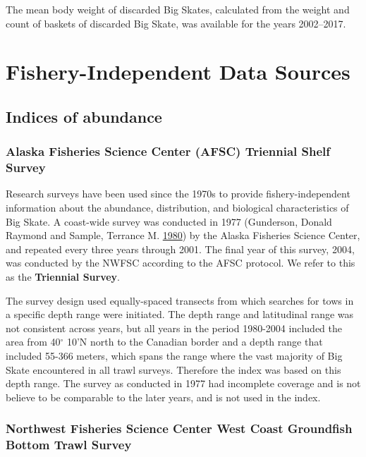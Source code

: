 \documentclass[12pt,]{article}
\begin{document}
The mean body weight of discarded Big Skates, calculated from the weight
and count of baskets of discarded Big Skate, was available for the years
2002--2017.

\hypertarget{fishery-independent-data-sources}{%
\section{Fishery-Independent Data
Sources}\label{fishery-independent-data-sources}}

\hypertarget{indices-of-abundance}{%
\subsection{Indices of abundance}\label{indices-of-abundance}}

\hypertarget{alaska-fisheries-science-center-afsc-triennial-shelf-survey}{%
\subsubsection{Alaska Fisheries Science Center (AFSC) Triennial Shelf
Survey}\label{alaska-fisheries-science-center-afsc-triennial-shelf-survey}}

Research surveys have been used since the 1970s to provide
fishery-independent information about the abundance, distribution, and
biological characteristics of Big Skate. A coast-wide survey was
conducted in 1977 (Gunderson, Donald Raymond and Sample, Terrance M.
\protect\hyperlink{ref-Gunderson1980}{1980}) by the Alaska Fisheries
Science Center, and repeated every three years through 2001. The final
year of this survey, 2004, was conducted by the NWFSC according to the
AFSC protocol. We refer to this as the \textbf{Triennial Survey}.

The survey design used equally-spaced transects from which searches for
tows in a specific depth range were initiated. The depth range and
latitudinal range was not consistent across years, but all years in the
period 1980-2004 included the area from 40\(^\circ\) 10'N north to the
Canadian border and a depth range that included 55-366 meters, which
spans the range where the vast majority of Big Skate encountered in all
trawl surveys. Therefore the index was based on this depth range. The
survey as conducted in 1977 had incomplete coverage and is not believe
to be comparable to the later years, and is not used in the index.

\hypertarget{northwest-fisheries-science-center-west-coast-groundfish-bottom-trawl-survey}{%
\subsubsection{Northwest Fisheries Science Center West Coast Groundfish
Bottom Trawl
Survey}\label{northwest-fisheries-science-center-west-coast-groundfish-bottom-trawl-survey}}
\end{document}
